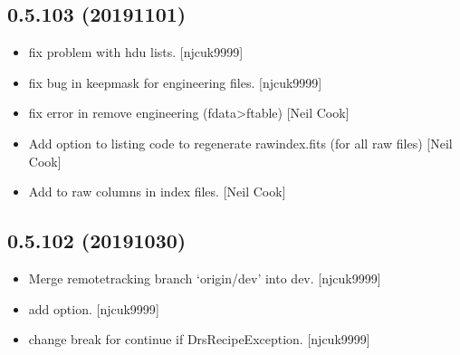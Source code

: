 \documentclass[a4paper,10pt,english]{report}
\begin{document}
\subsection{0.5.103 (2019\sphinxhyphen{}11\sphinxhyphen{}01)}
\label{\detokenize{misc/changelog:id58}}\begin{itemize}
\item {} 
 \sphinxhyphen{} fix problem with hdu lists. {[}njcuk9999{]}

\item {} 
 \sphinxhyphen{} fix bug in keepmask for
engineering files. {[}njcuk9999{]}

\item {} 
 \sphinxhyphen{} fix error in remove engineering (fdata\textendash{}\textgreater{}ftable)
{[}Neil Cook{]}

\item {} 
Add option to listing code to regenerate rawindex.fits (for all raw
files) {[}Neil Cook{]}

\item {} 
Add  to raw columns in index files. {[}Neil Cook{]}

\end{itemize}


\subsection{0.5.102 (2019\sphinxhyphen{}10\sphinxhyphen{}30)}
\label{\detokenize{misc/changelog:id59}}\begin{itemize}
\item {} 
Merge remote\sphinxhyphen{}tracking branch ‘origin/dev’ into dev. {[}njcuk9999{]}

\item {} 
 \sphinxhyphen{} add  option.
{[}njcuk9999{]}

\item {} 
 \sphinxhyphen{} change break for continue if
DrsRecipeException. {[}njcuk9999{]}

\end{itemize}
\end{document}
